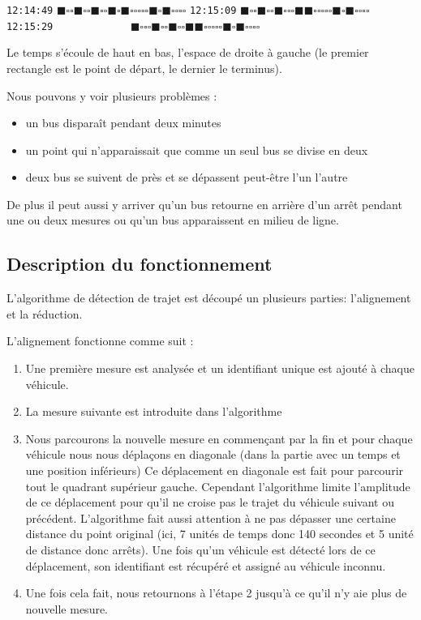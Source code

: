 \documentclass[letterpaper]{article}
\begin{document}
\begin{appendices}
\texttt{12:14:49} $\blacksquare\square\square\blacksquare\square\square\blacksquare\square\square\blacksquare\square\blacksquare\square\square\square\square\square\blacksquare\square\blacksquare\square\square\square\square$
\texttt{12:15:09} $\blacksquare\square\square\blacksquare\square\square\blacksquare\square\square\square\blacksquare\blacksquare\square\square\square\square\square\blacksquare\square\blacksquare\square\square\square\square$
\texttt{12:15:29} ~~~~~~~~~~~~~$\blacksquare\square\square\square\blacksquare\square\square\blacksquare\square\square\blacksquare\blacksquare\square\square\square\square\square\blacksquare\square\blacksquare\square\square\square\square$

Le temps s'écoule de haut en bas, l'espace de droite à gauche (le premier rectangle est le point de départ, le dernier le terminus).

Nous pouvons y voir plusieurs problèmes :
\begin{itemize}
    \item un bus disparaît pendant deux minutes
    \item un point qui n'apparaissait que comme un seul bus se divise en deux
    \item deux bus se suivent de près et se dépassent peut-être l'un l'autre
\end{itemize}

De plus il peut aussi y arriver qu'un bus retourne en arrière d'un arrêt pendant une ou deux mesures ou qu'un bus apparaissent en milieu de ligne.


\FloatBarrier
\subsection{Description du fonctionnement}

L'algorithme de détection de trajet est découpé un plusieurs parties: l'alignement et la réduction.

L'alignement fonctionne comme suit :
\begin{enumerate}
    \item Une première mesure est analysée et un identifiant unique est ajouté à chaque véhicule.
    \item La mesure suivante est introduite dans l'algorithme
    \item Nous parcourons la nouvelle mesure en commençant par la fin et pour chaque véhicule nous nous déplaçons en diagonale (dans la partie avec un temps et une position inférieurs)
    Ce déplacement en diagonale est fait pour parcourir tout le quadrant supérieur gauche. Cependant l'algorithme limite l'amplitude de ce déplacement pour qu'il ne croise pas le trajet du véhicule suivant ou précédent. L'algorithme fait aussi attention à ne pas dépasser une certaine distance du point original (ici, 7 unités de temps donc 140 secondes et 5 unité de distance donc arrêts).
    Une fois qu'un véhicule est détecté lors de ce déplacement, son identifiant est récupéré et assigné au véhicule inconnu.
    \item Une fois cela fait, nous retournons à l'étape 2 jusqu'à ce qu'il n'y aie plus de nouvelle mesure.
\end{enumerate}


\end{appendices}
\end{document}
